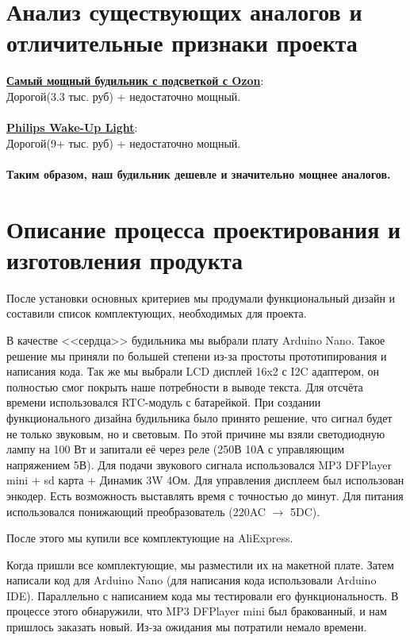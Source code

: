 \documentclass[12pt,a4paper]{article}
\begin{document}
\section{Анализ существующих аналогов и отличительные признаки проекта}

\href{https://www.ozon.ru/product/nochnik-umnyy-budilnik-imitiruet-voshod-solntsa-elektronnyy-budilnik-s-reguliruemoy-sensornoy-1627021430/}{\textbf{Самый мощный будильник с подсветкой с Ozon}}: \\
Дорогой(3.3 тыс. руб) + недостаточно мощный.
\\
\\
\href{https://www.philips.ru/c-m-hs/light-therapy}{\textbf{Philips Wake-Up Light}}: \\
Дорогой(9+ тыс. руб) + недостаточно мощный.
\\ \\
\textbf{Таким образом, наш будильник дешевле и значительно мощнее аналогов.}

\section{Описание процесса проектирования и изготовления продукта}

После установки основных критериев мы продумали функциональный дизайн и составили список комплектующих, необходимых для проекта. 

В качестве <<сердца>> будильника мы выбрали плату Arduino Nano. Такое решение мы приняли по большей степени из-за простоты прототипирования и написания кода. Так же мы выбрали LCD дисплей 16x2 с I2C адаптером, он полностью смог покрыть наше потребности в выводе текста. Для отсчёта времени использовался RTC-модуль с батарейкой. При создании функционального дизайна будильника было принято решение, что сигнал будет не только звуковым, но и световым. По этой причине мы взяли светодиодную лампу на 100 Вт и запитали её через реле (250В 10А с управляющим напряжением 5В). Для подачи звукового сигнала использовался MP3 DFPlayer mini + sd карта + Динамик 3W 4Ом. Для управления дисплеем был использован энкодер. Есть возможность выставлять время с точностью до минут. Для питания использовался понижающий преобразователь (220AC $\rightarrow$ 5DC).

После этого мы купили все комплектующие на AliExpress.

Когда пришли все комплектующие, мы разместили их на макетной плате.
Затем написали код для Arduino Nano (для написания кода использовали Arduino IDE). Параллельно с написанием кода мы тестировали его функциональность. В процессе этого обнаружили, что MP3 DFPlayer mini был бракованный, и нам пришлось заказать новый. Из-за ожидания мы потратили немало времени.
\end{document}
